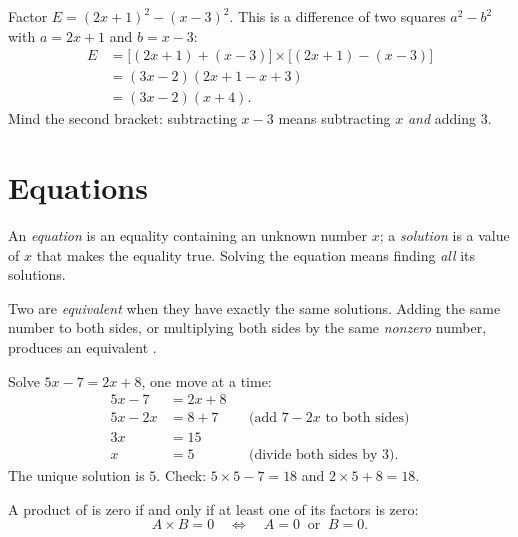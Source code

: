 \begin{example}\label{ex:g10:algebra:factorsteps}
Factor $E = (2x + 1)^2 - (x - 3)^2$. This is a difference of two squares
$a^2 - b^2$ with $a = 2x+1$ and $b = x-3$:
\begin{align*}
E &= \bigl[(2x+1) + (x-3)\bigr] \times \bigl[(2x+1) - (x-3)\bigr] \\
  &= (3x - 2)(2x + 1 - x + 3) \\
  &= (3x - 2)(x + 4).
\end{align*}
Mind the second bracket: subtracting $x - 3$ means subtracting $x$
\emph{and} adding $3$.
\end{example}

\section{Equations}

\begin{definition}\label{def:g10:algebra:equation}
An \emph{equation} is an equality containing an unknown
number $x$; a \emph{solution} is a value of $x$ that makes the equality
true. Solving the equation means finding \emph{all} its solutions.
\end{definition}

Two  are \emph{equivalent} when they have exactly the same
solutions. Adding the same number to both sides, or multiplying both sides
by the same \emph{nonzero} number, produces an equivalent .

\begin{example}\label{ex:g10:algebra:firstdegree}
Solve $5x - 7 = 2x + 8$, one move at a time:
\begin{align*}
5x - 7 &= 2x + 8 \\
5x - 2x &= 8 + 7 && \text{(add $7 - 2x$ to both sides)} \\
3x &= 15 \\
x &= 5 && \text{(divide both sides by $3$).}
\end{align*}
The unique solution is $5$. Check: $5 \times 5 - 7 = 18$ and
$2 \times 5 + 8 = 18$.
\end{example}

\begin{theorem}\label{thm:g10:algebra:zeroproduct}
A product of  is zero if and only if at least one of its
factors is zero:
\[
A \times B = 0
\quad\Longleftrightarrow\quad
A = 0 \ \text{ or } \ B = 0 .
\]
\end{theorem}

